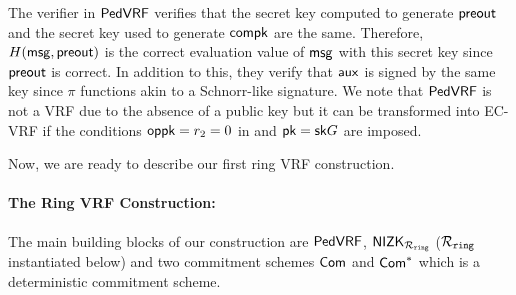 %



The verifier in $ {\mathsf{PedVRF}} $ verifies that the secret key computed to generate $ {\mathsf{preout}} $ and the secret key used to generate $ \mathsf{compk} $ are the same. Therefore, $ H(\mathsf{msg}, {\mathsf{preout}}) $ is the correct evaluation value of $ \mathsf{msg} $ with this secret key since $ {\mathsf{preout}} $ is correct. In addition to this, they verify that $ \mathsf{aux} $
is signed by the same key since $ \pi $ functions akin to a  Schnorr-like signature. We note that $ {\mathsf{PedVRF}} $ is not a VRF due to the absence of a public key but it can be transformed into EC-VRF if the conditions $\mathsf{oppk} = r_2 = 0$ in \Sign and $ \mathsf{pk} = \mathsf{sk} G $ are imposed.

Now, we are ready to describe our first ring VRF construction.
\paragraph{The Ring VRF Construction:} The main building blocks of our construction are $ {\mathsf{PedVRF}} $, $ {\mathsf{NIZK}}_{\mathcal{R}_{\mathtt{ring}}} $ ($\mathcal{R}_{\mathtt{ring}}$ instantiated below) and two commitment schemes $ \mathsf{Com} $ and $ \mathsf{Com}^* $ which is a deterministic commitment scheme. 

